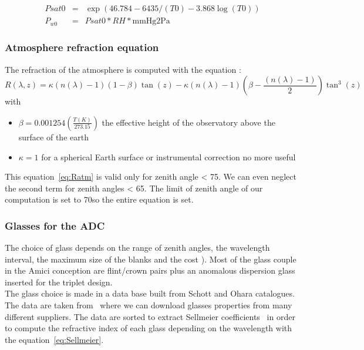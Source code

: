 \begin{eqnarray}
	Psat0 &= &\exp\left(46.784-6435/(T0)-3.868\log(T0)\right)\nonumber\\
	P_{w0} &= &Psat0*RH*\text{mmHg2Pa}\nonumber
\end{eqnarray}	


\subsubsection{Atmosphere refraction equation}
The refraction of the atmosphere is computed with the equation \cite{Stone1996}: 
\begin{equation}
	R(\lambda,z) = \kappa\left(n(\lambda)-1\right)\left(1-\beta\right)\tan(z) - \kappa\left(n(\lambda)-1\right)\left(\beta -\frac{\left(n(\lambda)-1\right)}{2}\right)\tan^3(z)\label{eq:Ratm}
\end{equation}
with 
\begin{itemize}
	\item $\beta = 0.001254\left(\frac{T(K)}{273.15}\right)$ the effective height of the observatory above the surface of the earth \cite{Stone1996}
	\item $\kappa = 1$ for a spherical Earth surface \cite{Stone1996} or instrumental correction no more useful \cite{Stone2002}
\end{itemize} 
This equation~\eqref{eq:Ratm} is valid only for zenith angle < 75\degree. We can even neglect the second term for zenith angles < 65\degree \cite{Tendulkar}. The limit of zenith angle of our computation is set to 70\degree so the entire equation is set.









\subsubsection{Glasses for the ADC}
The choice of glass depends on the range of zenith angles, the wavelength interval, the maximum size of the blanks and the cost \cite{WynneWors1986}). Most of the glass couple in the Amici conception are flint/crown pairs plus an anomalous dispersion glass inserted for the triplet design. \\
The glass choice is made in a data base built from Schott and Ohara catalogues. The data are taken from~\cite{RefIndexInfo} where we can download glasses properties from many different suppliers. The data are sorted to extract Sellmeier coefficients~\cite{SchottSellmeier} in order to compute the refractive index of each glass depending on the wavelength with the equation~\eqref{eq:Sellmeier}.

